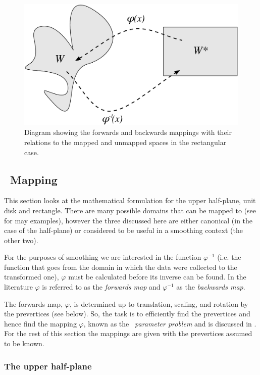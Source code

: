 \begin{figure} [t]
\centering
\includegraphics[scale=0.5]{sc/figs/mappingdia.pdf}
\caption{Diagram showing the forwards and backwards mappings with their relations to the mapped and unmapped spaces in the rectangular case.}
\label{mappingdia}
\end{figure}

\subsection{\sch\ Mapping}
\label{schparprob}
This section looks at the mathematical formulation for the upper half-plane, unit disk and rectangle. There are many possible domains that can be mapped to (see \cite[section 4]{driscoll} for may examples), however the three discussed here are either canonical (in the case of the half-plane) or considered to be useful in a smoothing context (the other two).

For the purposes of smoothing we are interested in the function $\varphi^{-1}$ (i.e. the function that goes from the domain in which the data were collected to the transformed one), $\varphi$ must be calculated before its inverse can be found. In the literature $\varphi$ is referred to as the \emph{forwards map} and $\varphi^{-1}$ as the \emph{backwards map}.

The forwards map, $\varphi$, is determined up to translation, scaling, and rotation by the prevertices (see below). So, the task is to efficiently find the prevertices and hence find the mapping $\varphi$, known as the \emph{\sch\ parameter problem} and is discussed in . For the rest of this section the mappings are given with the prevertices assumed to be known.

\subsubsection{The upper half-plane}
\label{sc-parprob}

